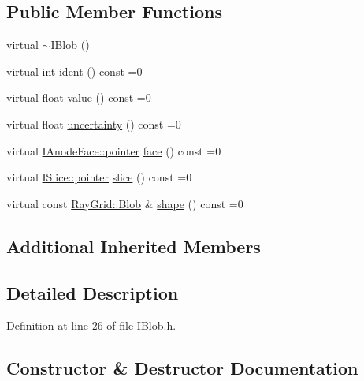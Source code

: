 \subsection*{Public Member Functions}
\begin{DoxyCompactItemize}
\item 
virtual \hyperlink{class_wire_cell_1_1_i_blob_a33b9f35292caf9a4c5837e68ee17265f}{$\sim$\+I\+Blob} ()
\item 
virtual int \hyperlink{class_wire_cell_1_1_i_blob_a0bad6b376cf6d8880e545ee70ea12dc4}{ident} () const =0
\item 
virtual float \hyperlink{class_wire_cell_1_1_i_blob_a3ce475d8fcd507ee6ffa0237db4d6c80}{value} () const =0
\item 
virtual float \hyperlink{class_wire_cell_1_1_i_blob_a02f100fb7404321e90471bd2430381e4}{uncertainty} () const =0
\item 
virtual \hyperlink{class_wire_cell_1_1_interface_a09c548fb8266cfa39afb2e74a4615c37}{I\+Anode\+Face\+::pointer} \hyperlink{class_wire_cell_1_1_i_blob_ab67fa2e25f4d401130f09a64c4e3924a}{face} () const =0
\item 
virtual \hyperlink{class_wire_cell_1_1_i_data_aff870b3ae8333cf9265941eef62498bc}{I\+Slice\+::pointer} \hyperlink{class_wire_cell_1_1_i_blob_a92f1e4a99d85edf6c3d8c9abf74b8a19}{slice} () const =0
\item 
virtual const \hyperlink{class_wire_cell_1_1_ray_grid_1_1_blob}{Ray\+Grid\+::\+Blob} \& \hyperlink{class_wire_cell_1_1_i_blob_a241a18f7f178a2021c643ffb6eed6e3f}{shape} () const =0
\end{DoxyCompactItemize}
\subsection*{Additional Inherited Members}


\subsection{Detailed Description}


Definition at line 26 of file I\+Blob.\+h.



\subsection{Constructor \& Destructor Documentation}
\mbox{\label{class_wire_cell_1_1_i_blob_a33b9f35292caf9a4c5837e68ee17265f}} 
